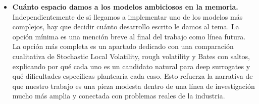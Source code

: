 \documentclass[11pt,a4paper]{article}
\begin{document}
\begin{itemize}
\item \textbf{Cuánto espacio damos a los modelos ambiciosos en la memoria.} Independientemente de si llegamos a implementar uno de los modelos más complejos, hay que decidir cuánto desarrollo escrito le damos al tema. La opción mínima es una mención breve al final del trabajo como línea futura. La opción más completa es un apartado dedicado con una comparación cualitativa de Stochastic Local Volatility, rough volatility y Bates con saltos, explicando por qué cada uno es un candidato natural para deep surrogates y qué dificultades específicas plantearía cada caso. Esto refuerza la narrativa de que nuestro trabajo es una pieza modesta dentro de una línea de investigación mucho más amplia y conectada con problemas reales de la industria.
\end{itemize}
\end{document}
